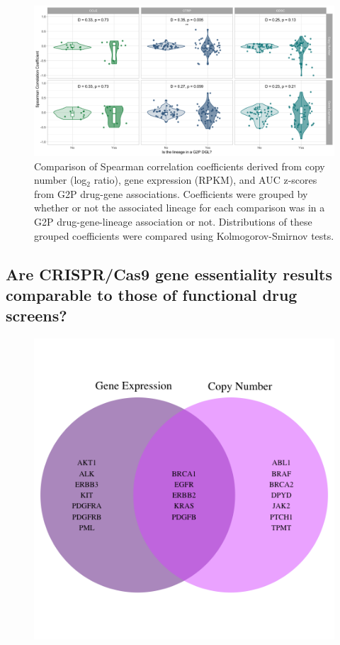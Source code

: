 \documentclass[man,floatsintext]{apa6}
\begin{document}
\begin{figure}
\centering
\includegraphics{./plots/manuscript/g2p_spearman_ks_res_plot.png}
\caption{\label{fig:ksplot}Comparison of Spearman correlation coefficients
derived from copy number (log\(_2\) ratio), gene expression (RPKM), and
AUC z-scores from G2P drug-gene associations. Coefficients were grouped
by whether or not the associated lineage for each comparison was in a
G2P drug-gene-lineage association or not. Distributions of these grouped
coefficients were compared using Kolmogorov-Smirnov tests.}
\end{figure}

\subsection{Are CRISPR/Cas9 gene essentiality results comparable to
those of functional drug
screens?}\label{are-crisprcas9-gene-essentiality-results-comparable-to-those-of-functional-drug-screens}

\begin{figure}
\centering
\includegraphics{./plots/manuscript/crispr_venn.png}
\caption{}
\end{figure}
\end{document}

